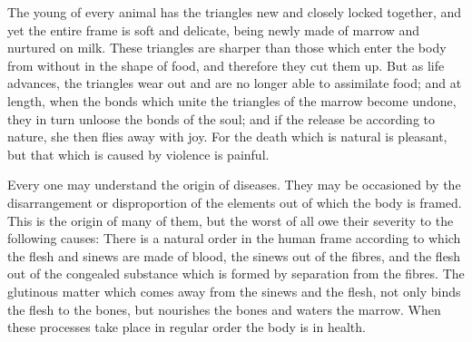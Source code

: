 \documentclass[11pt,letter]{article}
\begin{document}
\par  The young of every animal has the triangles new and closely locked together, and yet the entire frame is soft and delicate, being newly made of marrow and nurtured on milk. These triangles are sharper than those which enter the body from without in the shape of food, and therefore they cut them up. But as life advances, the triangles wear out and are no longer able to assimilate food; and at length, when the bonds which unite the triangles of the marrow become undone, they in turn unloose the bonds of the soul; and if the release be according to nature, she then flies away with joy. For the death which is natural is pleasant, but that which is caused by violence is painful.

\par  Every one may understand the origin of diseases. They may be occasioned by the disarrangement or disproportion of the elements out of which the body is framed. This is the origin of many of them, but the worst of all owe their severity to the following causes: There is a natural order in the human frame according to which the flesh and sinews are made of blood, the sinews out of the fibres, and the flesh out of the congealed substance which is formed by separation from the fibres. The glutinous matter which comes away from the sinews and the flesh, not only binds the flesh to the bones, but nourishes the bones and waters the marrow. When these processes take place in regular order the body is in health.
\end{document}
